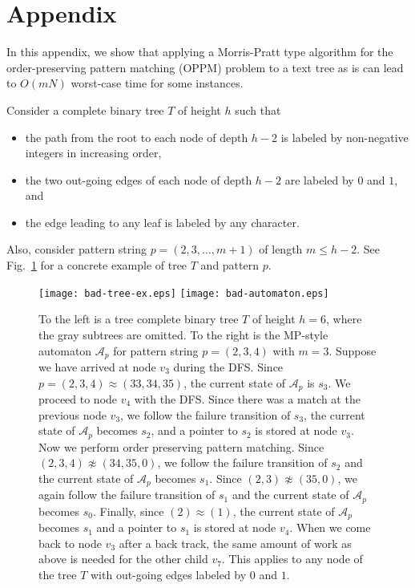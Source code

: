 \documentclass[a4paper,11pt]{article}
\begin{document}




\clearpage

\appendix

\section{Appendix}

In this appendix,
we show that applying a Morris-Pratt type algorithm
for the order-preserving pattern matching (OPPM)
problem to a text tree as is can lead to $O(mN)$ worst-case time
for some instances.

Consider a complete binary tree $T$ of height $h$ such that
\begin{itemize}
\item
  the path from the root to each node of depth $h-2$
  is labeled by non-negative integers in increasing order,
\item
  the two out-going edges of each node of depth $h-2$
  are labeled by $0$ and $1$, and
\item
  the edge leading to any leaf is labeled by any character.
\end{itemize}
Also, consider pattern string $p = (2, 3, \ldots, m+1)$ of length $m \leq h-2$.
See Fig.~\ref{fig:bad-example} for a concrete example of tree $T$ and pattern $p$.

\begin{figure}[tbhp] 
 \centerline{
   \texttt{[image: bad-tree-ex.eps]}
   \hfill
   \texttt{[image: bad-automaton.eps]}
 }
 \caption{
   To the left is a tree complete binary tree $T$ of height $h = 6$,
   where the gray subtrees are omitted.
   To the right is the MP-style automaton $\mathcal{A}_p$ for pattern string $p = (2, 3, 4)$ with $m = 3$.
   Suppose we have arrived at node $v_3$ during the DFS.
   Since $p = (2, 3, 4) \approx (33, 34, 35)$,
   the current state of $\mathcal{A}_p$ is $s_3$.
   We proceed to node $v_4$ with the DFS.  
   Since there was a match at the previous node $v_3$,
   we follow the failure transition of $s_3$,
   the current state of $\mathcal{A}_p$ becomes $s_2$,
   and a pointer to $s_2$ is stored at node $v_3$.
   Now we perform order preserving pattern matching.
   Since $(2, 3, 4) \not \approx (34, 35, 0)$,
   we follow the failure transition of $s_2$ and
   the current state of $\mathcal{A}_p$ becomes $s_1$.
   Since $(2, 3) \not \approx (35, 0)$,
   we again follow the failure transition of $s_1$ and
   the current state of $\mathcal{A}_p$ becomes $s_0$.
   Finally, since $(2) \approx (1)$,
   the current state of $\mathcal{A}_p$ becomes $s_1$
   and a pointer to $s_1$ is stored at node $v_4$.
   When we come back to node $v_3$ after a back track,
   the same amount of work as above is needed for the other child $v_7$.
   This applies to any node of the tree $T$
   with out-going edges labeled by $0$ and $1$.
 }
\label{fig:bad-example}
\end{figure}
\end{document}
